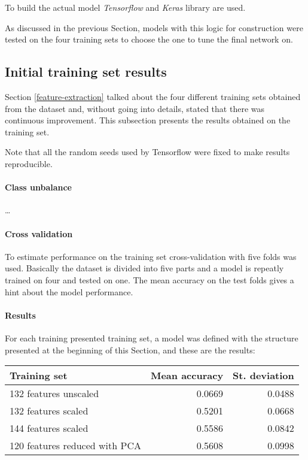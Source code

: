 To build the actual model \emph{Tensorflow} and \emph{Keras} library 
are used.~\cite{tensorflow}~\cite{keras}

As discussed in the previous Section, models with this logic for 
construction were tested on the four training sets to choose the one to tune 
the final network on.

\subsection{Initial training set results}

Section \vref{feature-extraction} talked about the four different 
training sets obtained from the dataset and, without going into details, 
stated that there was continuous improvement. This subsection presents
the results obtained on the training set. 

Note that all the random seeds used by Tensorflow were fixed 
to make results reproducible.

\paragraph{Class unbalance}
\dots

\paragraph{Cross validation}
To estimate performance on the training set cross-validation with 
five folds was used. Basically the dataset is divided into five parts 
and a model is repeatly trained on four and tested on one. 
The mean accuracy on the test folds gives a hint about the model performance.

\paragraph{Results}
For each training presented training set, a model was defined 
with the structure presented at the beginning of this Section, 
and these are the results:

\begin{center}
    \begin{tabular}{ |l|r|r| } 
        \hline
        Training set & Mean accuracy & St. deviation \\
        \hline
        132 features unscaled &  0.0669 & 0.0488 \\
        132 features scaled &  0.5201 & 0.0668 \\
        144 features scaled &  0.5586 & 0.0842 \\
        120 features reduced with PCA &  0.5608 & 0.0998 \\
        \hline
    \end{tabular}
\end{center}

